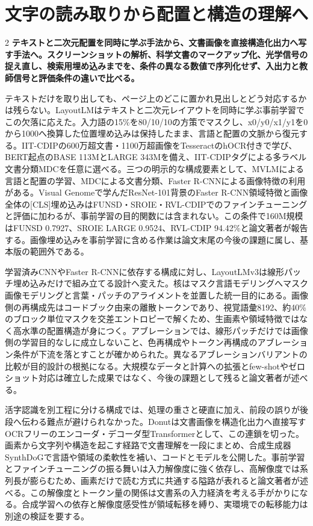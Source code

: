 \documentclass[lualatex,a4paper,10pt]{jlreq}
\begin{document}
\section{文字の読み取りから配置と構造の理解へ}
\label{sec:p05}
\begin{multicols}{2}
\raggedcolumns
\noindent\textbf{テキストと二次元配置を同時に学ぶ手法から、文書画像を直接構造化出力へ写す手法へ。スクリーンショットの解析、科学文書のマークアップ化、光学信号の捉え直し、検索用埋め込みまでを、条件の異なる数値で序列化せず、入出力と教師信号と評価条件の違いで比べる。}\autocite{vmd025,vmd026,vmd027}\par\medskip
\noindent テキストだけを取り出しても、ページ上のどこに置かれ見出しとどう対応するかは残らない。LayoutLMはテキストと二次元レイアウトを同時に学ぶ事前学習でこの欠落に応えた。入力語の15\%を80/10/10の方策でマスクし、x0/y0/x1/y1を0から1000へ換算した位置埋め込みは保持したまま、言語と配置の文脈から復元する。IIT-CDIPの600万超文書・1100万超画像をTesseractのhOCR付きで学び、BERT起点のBASE 113MとLARGE 343Mを備え、IIT-CDIPタグによる多ラベル文書分類MDCを任意に選べる。三つの明示的な構成要素として、MVLMによる言語と配置の学習、MDCによる文書分類、Faster R-CNNによる画像特徴の利用がある。Visual Genomeで学んだResNet-101背景のFaster R-CNN領域特徴と画像全体の[CLS]埋め込みはFUNSD・SROIE・RVL-CDIPでのファインチューニングと評価に加わるが、事前学習の目的関数には含まれない。この条件で160M規模はFUNSD 0.7927、SROIE LARGE 0.9524、RVL-CDIP 94.42\%と論文著者が報告する。画像埋め込みを事前学習に含める作業は論文末尾の今後の課題に属し、基本版の範囲外である。\autocite{vmd023}\par\medskip
\noindent 学習済みCNNやFaster R-CNNに依存する構成に対し、LayoutLMv3は線形パッチ埋め込みだけで組み立てる設計へ変えた。核はマスク言語モデリングへマスク画像モデリングと言葉・パッチのアライメントを並置した統一目的にある。画像側の再構成先はコードブック由来の離散トークンであり、視覚語彙8192、約40\%のブロック単位マスクを交差エントロピーで解くため、生画素や領域特徴ではなく高水準の配置構造が身につく。アブレーションでは、線形パッチだけでは画像側の学習目的なしに成立しないこと、色再構成やトークン再構成のアブレーション条件が下流を落とすことが確かめられた。異なるアブレーションバリアントの比較が目的設計の根拠になる。大規模なデータと計算への拡張とfew-shotやゼロショット対応は確立した成果ではなく、今後の課題として残ると論文著者が述べる。\autocite{vmd024}\par\medskip
\noindent 活字認識を別工程に分ける構成では、処理の重さと硬直に加え、前段の誤りが後段へ伝わる難点が避けられなかった。Donutは文書画像を構造化出力へ直接写すOCRフリーのエンコーダ・デコーダ型Transformerとして、この連鎖を切った。画素から文字列や構造を起こす経路で文書理解を一段にまとめ、合成生成器SynthDoGで言語や領域の柔軟性を補い、コードとモデルを公開した。事前学習とファインチューニングの振る舞いは入力解像度に強く依存し、高解像度では系列長が膨らむため、画素だけで読む方式に共通する隘路が表れると論文著者が述べる。この解像度とトークン量の関係は文書系の入力経済を考える手がかりになる。合成学習への依存と解像度感受性が領域転移を縛り、実環境での転移能力は別途の検証を要する。\autocite{vmd025}\par\medskip

\end{multicols}
\end{document}
